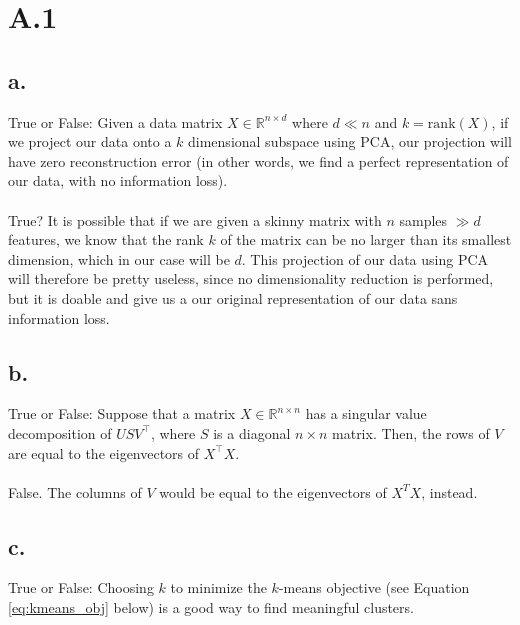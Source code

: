 \documentclass{article}
\date{{}}
\newcommand{\1}{\mathbf{1}}
\begin{document}
\thispagestyle{firstpageheader}

\section*{A.1}
{\Large 


\subsection*{a.}

True or False: Given a data matrix $X \in \mathbb{R}^{n \times d}$ where $d\ll n$ and $k = \mathrm{rank}(X)$, if we project our data onto a $k$ dimensional subspace using PCA, our projection will have zero reconstruction error (in other words, we find a perfect representation of our data, with no information loss). \\ \\

True? It is possible that if we are given a skinny matrix with $n$ samples $\gg d$ features, we know that the rank $k$ of the matrix can be no larger than its smallest dimension, which in our case will be $d$. This projection of our data using PCA will therefore be pretty useless, since no dimensionality reduction is performed, but it is doable and give us a our original representation of our data sans information loss. 

\subsection*{b.}

True or False: Suppose that a matrix $X\in \mathbb{R}^{n \times n}$ has a singular value decomposition of $USV^{\top}$, where $S$ is a diagonal $n \times n$ matrix. Then, the rows of $V$ are equal to the eigenvectors of $X^{\top}X$. \\ \\

False. The columns of $V$ would be equal to the eigenvectors of $X^T X$, instead.

\subsection*{c.}

True or False: Choosing $k$ to minimize the $k$-means objective (see Equation \eqref{eq:kmeans_obj} below) is a good way to find meaningful clusters. \\ \\

}
\end{document}
